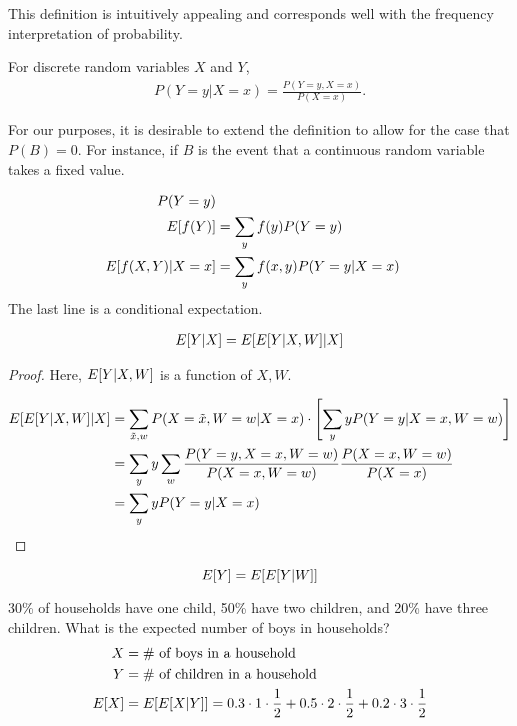 \documentclass[twoside]{article}
\begin{document}
This definition is intuitively appealing and corresponds well with the
frequency interpretation of probability.

\begin{example}
  For discrete random variables $X$ and $Y$,
  \begin{align*}
    P(Y = y | X = x) = \frac{P(Y = y, X = x)}{P(X = x)}.
  \end{align*}
\end{example}

For our purposes, it is desirable to extend the definition to allow for
the case that $P(B) = 0$.  For instance, if $B$ is the event that a
continuous random variable takes a fixed value.  

\begin{align*}
  P(Y = y) \\
  E[f(Y)] &= \sum_y f(y) P(Y = y) \\
  E[f(X, Y) | X = x] &= \sum_y f(x, y) P(Y = y | X = x)
\end{align*}
The last line is a conditional expectation.

\begin{theorem}
\begin{align*}
  E[Y | X] = E[E[Y | X, W] | X]
\end{align*}
\end{theorem}
\begin{proof}
  Here, $E[Y | X, W]$ is a function of $X, W$. 

  \begin{align*}
    E[E[Y | X, W] | X] &= \sum_{\tilde{x}, w} P(X = \tilde{x}, W = w | X = x)
    \cdot \left[ \sum_y yP(Y = y | X = x, W = w)\right] \\
    &= \sum_y y \sum_w \frac{P(Y = y, X = x, W = w)}{P(X = x, W = w)}  \frac{P(X =
    x, W = w)}{P(X = x)} \\
    &= \sum_y y P(Y = y | X = x)
  \end{align*}
\end{proof}
\begin{corollary}
  \[E[Y] = E[E[Y | W]]\]
\end{corollary}

\begin{example}
30\% of households have one child, 50\% have two children, and 20\% have
three children. What is the expected number of boys in households?
\begin{align*}
  X &= \text{\# of boys in a household} \\
  Y &= \text{\# of children in a household} \\
  E[X] &= E[E[X | Y]]= 0.3 \cdot 1 \cdot \frac{1}{2} + 0.5 \cdot 2 \cdot 
  \frac{1}{2} + 0.2 \cdot 3 \cdot \frac{1}{2}
\end{align*}
\end{example}
\end{document}
